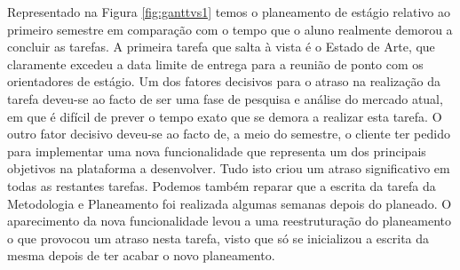 Representado na Figura \ref{fig:ganttvs1} temos o planeamento de estágio relativo ao primeiro semestre em comparação com o tempo que o aluno realmente demorou a concluir as tarefas. A primeira tarefa que salta à vista é o Estado de Arte, que claramente excedeu a data limite de entrega para a reunião de ponto com os orientadores de estágio. Um dos fatores decisivos para o atraso na realização da tarefa deveu-se ao facto de ser uma fase de pesquisa e análise do mercado atual, em que é difícil de prever o tempo exato que se demora a realizar esta tarefa. O outro fator decisivo deveu-se ao facto de, a meio do semestre, o cliente ter pedido para implementar uma nova funcionalidade que representa um dos principais objetivos na plataforma a desenvolver. Tudo isto criou um atraso significativo em todas as restantes tarefas. Podemos também reparar que a escrita da tarefa da Metodologia e Planeamento foi realizada algumas semanas depois do planeado. O aparecimento da nova funcionalidade levou a uma reestruturação do planeamento o que provocou um atraso nesta tarefa, visto que só se inicializou a escrita da mesma depois de ter acabar o novo planeamento.



\glsresetall



